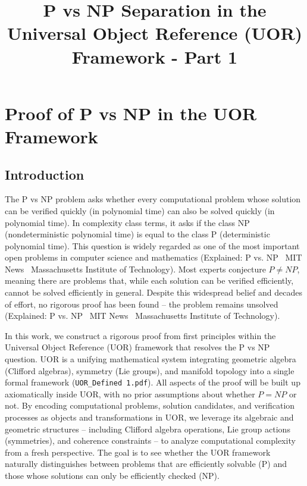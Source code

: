 \documentclass[11pt]{article}
\title{P vs NP Separation in the Universal Object Reference (UOR) Framework - Part 1}
\date{}
\begin{document}
\maketitle

\section{Proof of P vs NP in the UOR Framework}

\subsection{Introduction}
The P vs NP problem asks whether every computational problem whose solution can be verified quickly (in polynomial time) can also be solved quickly (in polynomial time). In complexity class terms, it asks if the class NP (nondeterministic polynomial time) is equal to the class P (deterministic polynomial time). This question is widely regarded as one of the most important open problems in computer science and mathematics (Explained: P vs. NP \textbar\ MIT News \textbar\ Massachusetts Institute of Technology). Most experts conjecture \(P \neq NP\), meaning there are problems that, while each solution can be verified efficiently, cannot be solved efficiently in general. Despite this widespread belief and decades of effort, no rigorous proof has been found -- the problem remains unsolved (Explained: P vs. NP \textbar\ MIT News \textbar\ Massachusetts Institute of Technology).

In this work, we construct a rigorous proof from first principles within the Universal Object Reference (UOR) framework that resolves the P vs NP question. UOR is a unifying mathematical system integrating geometric algebra (Clifford algebras), symmetry (Lie groups), and manifold topology into a single formal framework (\texttt{UOR\_Defined 1.pdf}). All aspects of the proof will be built up axiomatically inside UOR, with no prior assumptions about whether \(P = NP\) or not. By encoding computational problems, solution candidates, and verification processes as objects and transformations in UOR, we leverage its algebraic and geometric structures -- including Clifford algebra operations, Lie group actions (symmetries), and coherence constraints -- to analyze computational complexity from a fresh perspective. The goal is to see whether the UOR framework naturally distinguishes between problems that are efficiently solvable (P) and those whose solutions can only be efficiently checked (NP).
\end{document}
